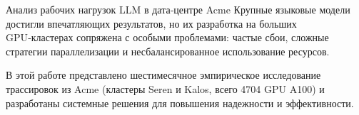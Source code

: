 \begin{frame}{Анализ рабочих нагрузок LLM в дата‑центре Acme}
	Крупные языковые модели достигли впечатляющих результатов, 
	но их разработка на больших GPU‑кластерах сопряжена с особыми проблемами:
	частые сбои, сложные стратегии параллелизации и несбалансированное использование ресурсов.
	
	В этой работе представлено шестимесячное эмпирическое исследование трассировок из Acme 
	(кластеры Seren и Kalos, всего 4704 GPU A100) и разработаны системные решения 
	для повышения надежности и эффективности.
\end{frame}